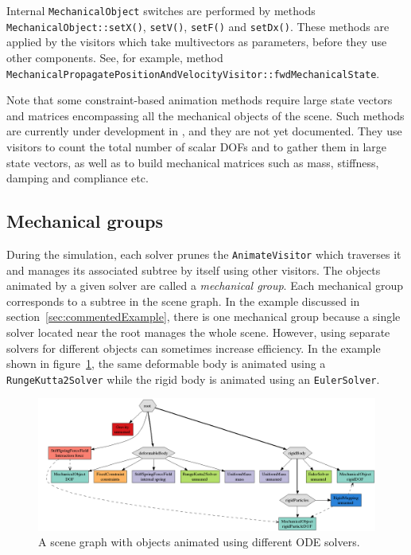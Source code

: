 Internal  \texttt{MechanicalObject} switches are performed by methods \texttt{MechanicalObject::setX()}, \texttt{setV()}, \texttt{setF()} and  \texttt{setDx()}.
These methods are applied by the visitors which take multivectors as parameters, before they use other components. 
See, for example, method\\ \texttt{MechanicalPropagatePositionAndVelocityVisitor::fwdMechanicalState}.

Note that some constraint-based animation methods require large state vectors and matrices encompassing all the mechanical objects of the scene.
Such methods are currently under development in \sofa, and they are not yet documented.
They use visitors to count the total number of scalar DOFs and to gather them in large state vectors, as well as to build mechanical matrices  such as mass, stiffness, damping and compliance etc.

\subsection{Mechanical groups}
During the simulation, each solver prunes the \texttt{AnimateVisitor} which traverses it and manages its associated subtree by itself using other visitors.
The objects animated by a given solver are called a \emph{mechanical group}.
Each mechanical group corresponds to a subtree in the scene graph.
In the example discussed in section~\ref{sec:commentedExample}, there is one mechanical group because a single solver located near the root manages the whole scene.
However, using separate solvers for different objects can sometimes increase efficiency.
In the example shown in figure~\ref{fig:twoSolvers}, the same deformable body is animated using a \texttt{RungeKutta2Solver} while the rigid body is animated using an \texttt{EulerSolver}.
\begin{figure}
 \centering
 \includegraphics[width=0.95\linewidth]{twoSolvers}
  \caption{A scene graph with objects animated using different ODE solvers.}
 \label{fig:twoSolvers}
\end{figure}


